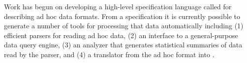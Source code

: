 


Work has begun on developing a high-level specification 
language called \pads{} for describing ad hoc data formats.  From a
\pads{} specification it is currently possible to generate a number of
tools for processing that data automatically including (1)
efficient parsers for reading ad hoc data, (2) an interface to a 
general-purpose data query engine, (3) an analyzer that generates 
statistical summaries of data read by the parser, and (4)
a translator from the ad hoc format into \xml.  

